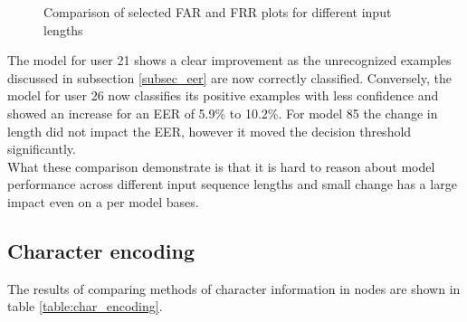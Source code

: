 \begin{figure}[H]
	\centering

	\caption{Comparison of selected FAR and FRR plots for different input lengths}%
	\label{fig:selected_frr_vs_far}%
\end{figure}

The model for user 21 shows a clear improvement as the unrecognized examples discussed in subsection \ref{subsec_eer} are now correctly classified. Conversely, the model for user 26 now classifies its positive examples with less confidence and showed an increase for an EER of 5.9\% to 10.2\%. For model 85 the change in length did not impact the EER, however it moved the decision threshold significantly.\\
What these comparison demonstrate is that it is hard to reason about model performance across different input sequence lengths and small change has a large impact even on a per model bases.

\subsection{Character encoding}
The results of comparing methods of character information in nodes are shown in table
\ref{table:char_encoding}.

